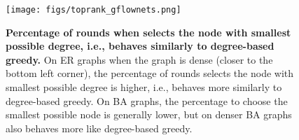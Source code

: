 \begin{figure}[!t]
    \centering
    \texttt{[image: figs/toprank\_gflownets.png]}
    \caption{\textbf{Percentage of rounds when \gflownets selects the node with smallest possible degree, i.e., behaves similarly to degree-based greedy.} On ER graphs when the graph is dense (closer to the bottom left corner), the percentage of rounds \gflownets selects the node with smallest possible degree is higher, i.e., behaves more similarly to degree-based greedy. On BA graphs, the percentage to choose the smallest possible node is generally lower, but on denser BA graphs \gflownets also behaves more like degree-based greedy.}
    \label{fig:toprank-gflownets}
\end{figure}